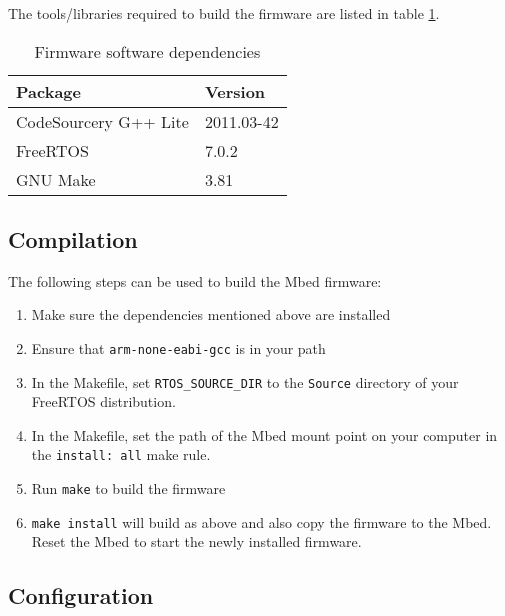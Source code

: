 			The tools/libraries required to build the firmware are listed in table
			\ref{tab:dependencies}.
			
			\begin{table}
				\centering
				\begin{tabular}{l l}
					\toprule
					Package & Version \\
					\midrule
					CodeSourcery G++ Lite & 2011.03-42 \\
					FreeRTOS & 7.0.2 \\
					GNU Make & 3.81 \\
					\bottomrule
				\end{tabular}
				
				\caption{Firmware software dependencies}
				\label{tab:dependencies}
			\end{table}
			
		\subsection{Compilation}
			
			\label{sec:compilation}
			
			The following steps can be used to build the Mbed firmware:
			
			\begin{enumerate}
				
				\item Make sure the dependencies mentioned above are installed
				
				\item Ensure that \verb|arm-none-eabi-gcc| is in your path
				
				\item In the Makefile, set \verb|RTOS_SOURCE_DIR| to the \verb|Source|
				directory of your FreeRTOS distribution.
				
				\item In the Makefile, set the path of the Mbed mount point on your
				computer in the \verb|install: all| make rule.
				
				\item Run \verb|make| to build the firmware
				
				\item \verb|make install| will build as above and also copy the firmware
				to the Mbed. Reset the Mbed to start the newly installed firmware.
				
			\end{enumerate}
		
		\subsection{Configuration}
			

